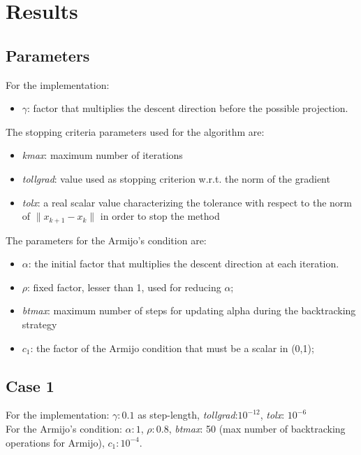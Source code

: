 \documentclass{article}
\begin{document}
\section{Results}
\subsection{Parameters}
For the implementation:\begin{itemize}
    \item ${\gamma }$: factor that multiplies the descent direction before the possible projection.
\end{itemize} 
The stopping criteria parameters used for the algorithm are:
\begin{itemize}
    \item \emph{kmax}: maximum number of iterations 
    \item \emph{tollgrad}: value used as stopping criterion w.r.t. the norm of the gradient
    \item \emph{tolx}: a real scalar value characterizing the tolerance with respect to the norm of  $\lVert x_{k+1} - x_{k}\lVert$ in order to stop the method
\end{itemize}

The parameters for the Armijo's condition are:
\begin{itemize}
    \item $\alpha$: the initial factor that multiplies the descent direction at each iteration.
    \item $\rho$: fixed factor, lesser than 1, used for reducing $\alpha$;
    \item \emph{btmax}: maximum number of steps for updating alpha during the backtracking strategy
    \item \emph{$c_{1}$}: the factor of the Armijo condition that must be a scalar in (0,1);
\end{itemize}

\subsection{Case 1}

 For the implementation: ${\gamma: 0.1 }$ as step-length, \emph{tollgrad}:$10^{-12}$, \emph{tolx}: $10^{-6}$ \\
For the Armijo's condition: $\alpha:1$, $\rho: 0.8$, \emph{btmax}: 50 (max number of backtracking operations for Armijo), \emph{$c_{1}: 10^{-4}$}.
\end{document}
